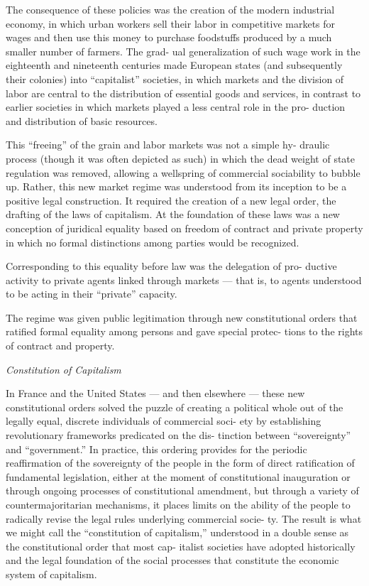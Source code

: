 \documentclass[
]{book}
\begin{document}
The consequence of these policies was the creation of the
modern industrial economy, in which urban workers sell their labor in
competitive markets for wages and then use this money to purchase
foodstuffs produced by a much smaller number of farmers. The grad-
ual generalization of such wage work in the eighteenth and nineteenth
centuries made European states (and subsequently their colonies) into
``capitalist'' societies, in which markets and the division of labor are
central to the distribution of essential goods and services, in contrast to
earlier societies in which markets played a less central role in the pro-
duction and distribution of basic resources.

This ``freeing'' of the grain and labor markets was not a simple hy-
draulic process (though it was often depicted as such) in which the
dead weight of state regulation was removed, allowing a wellspring of
commercial sociability to bubble up. Rather, this new market regime
was understood from its inception to be a positive legal construction.
It required the creation of a new legal order, the drafting of the laws of
capitalism. At the foundation of these laws was a new conception of
juridical equality based on freedom of contract and private property in
which no formal distinctions among parties would be recognized.

Corresponding to this equality before law was the delegation of pro-
ductive activity to private agents linked through markets --- that is, to
agents understood to be acting in their ``private'' capacity.

The regime was given public legitimation through new constitutional orders
that ratified formal equality among persons and gave special protec-
tions to the rights of contract and property.

\emph{Constitution of Capitalism}

In France and the United States --- and then elsewhere --- these
new constitutional orders solved the puzzle of creating a political
whole out of the legally equal, discrete individuals of commercial soci-
ety by establishing revolutionary frameworks predicated on the dis-
tinction between ``sovereignty'' and ``government.'' In practice, this
ordering provides for the periodic reaffirmation of the sovereignty of
the people in the form of direct ratification of fundamental legislation,
either at the moment of constitutional inauguration or through ongoing
processes of constitutional amendment, but through a variety of
countermajoritarian mechanisms, it places limits on the ability of the
people to radically revise the legal rules underlying commercial socie-
ty. The result is what we might call the ``constitution of capitalism,''
understood in a double sense as the constitutional order that most cap-
italist societies have adopted historically and the legal foundation of
the social processes that constitute the economic system of capitalism.
\end{document}

